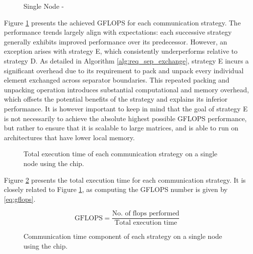 \begin{figure}[H]
    \centering
    \caption{Single Node - }
    \label{fig:gflopsdefqsingle}
\end{figure}
Figure \ref{fig:gflopsdefqsingle} presents the achieved GFLOPS for each communication strategy. The performance trends largely align with expectations: each successive strategy generally exhibits improved performance over its predecessor. However, an exception arises with strategy E, which consistently underperforms relative to strategy D. As detailed in Algorithm \ref{alg:req_sep_exchange}, strategy E incurs a significant overhead due to its requirement to pack and unpack every individual element exchanged across separator boundaries. This repeated packing and unpacking operation introduces substantial computational and memory overhead, which offsets the potential benefits of the strategy and explains its inferior performance. It is however important to keep in mind that the goal of strategy E is not necessarily to achieve the absolute highest possible GFLOPS performance, but rather to ensure that it is scalable to large matrices, and is able to run on architectures that have lower local memory.
 
\begin{figure}[H]
    \centering
    \caption{Total execution time of each communication strategy on a single node using the  chip.}
    \label{fig:tdefqsingle}
\end{figure}

Figure \ref{fig:tdefqsingle} presents the total execution time for each communication strategy. It is closely related to Figure \ref{fig:gflopsdefqsingle}, as computing the GFLOPS number is given by \ref{eq:gflops}.

\begin{equation}
    \label{eq:gflops}
    \text{GFLOPS} = \frac{\text{No. of flops performed}}{\text{Total execution time}}
\end{equation}

\begin{figure}[H]
    \centering
    \caption{Communication time component of each strategy on a single node using the  chip.}
    \label{fig:tcommdefqsingle}
\end{figure}

